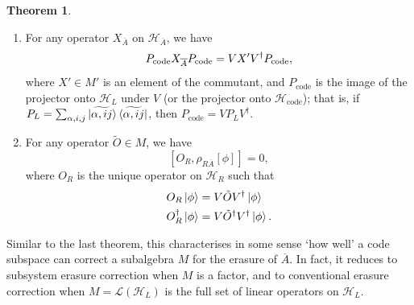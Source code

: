 \documentclass[12pt,a4paper]{report}
\numberwithin{equation}{section}
\newcommand{\ketbra}[2]{\ket{#1}\bra{#2}}
\newcommand{\ketbras}[1]{\ketbra{#1}{#1}}
\newcommand{\Pc}{P_{\text{code}}}
\newcommand{\Hcode}{\mathcal{H}_{\text{code}}}
\newcommand{\ol}[1]{\overline{#1}}
\theoremstyle{definition}
\theoremstyle{theorem}
\newtheorem{theorem}{Theorem}[section]
\theoremstyle{theorem}
\theoremstyle{example}
\theoremstyle{definition}
\begin{document}
\begin{theorem}
\begin{enumerate}
		\item For any operator $X_{\ol{A}}$ on $\mathcal{H}_{\ol{A}}$, we have
		\begin{equation}\label{O3}
			\Pc\Xabar\Pc=VX'V^{\dagger}\Pc,
		\end{equation}
		where $X'\in M'$ is an element of the commutant, and $\Pc$ is the image of the projector onto $\mathcal{H}_{L}$ under $V$ (or the projector onto $\Hcode$); that is, if $P_{L}=\sum_{\alpha,i,j}\ketbras{\widetilde{\alpha,ij}}$, then $\Pc=VP_{L}V^{\dagger}$.
		\item For any operator $\tilde{O}\in M$, we have
		\begin{equation}\label{O4}
			[O_{R},\rho_{R\ol{A}}[\phi]]=0,
		\end{equation}
		where $O_{R}$ is the unique operator on $\mathcal{H}_{R}$ such that
		\begin{equation}\label{O5}
			\begin{aligned}
				O_{R}\ket{\phi}&=V\tilde{O}V^{\dagger}\ket{\phi}\\
				O_{R}^{\dagger}\ket{\phi}&=V\tilde{O}^{\dagger}V^{\dagger}\ket{\phi}.
			\end{aligned}
		\end{equation}
	\end{enumerate}
\end{theorem}
Similar to the last theorem, this characterises in some sense `how well' a code subspace can correct a subalgebra $M$ for the erasure of $\ol{A}$. In fact, it reduces to subsystem erasure correction when $M$ is a factor, and to conventional erasure correction when $M=\mathcal{L}(\mathcal{H}_{L})$ is the full set of linear operators on $\mathcal{H}_{L}$.
\end{document}
